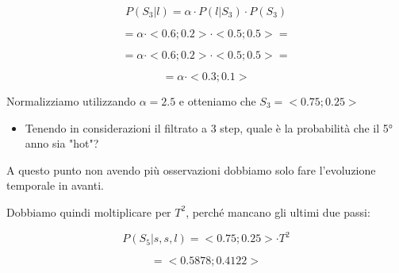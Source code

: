 \documentclass{article}
\begin{document}
\[
P(S_3 | l) = \alpha \cdot P(l | S_3) \cdot P(S_3)
\]

\[
 = \alpha \cdot <0.6; 0.2> \cdot <0.5; 0.5> =
\]

\[
= \alpha \cdot <0.6; 0.2> \cdot <0.5; 0.5> =
\]

\[
= \alpha \cdot <0.3; 0.1>
\]

Normalizziamo utilizzando $\alpha = 2.5$ e otteniamo che $S_3 = <0.75; 0.25>$

\pagebreak

\begin{itemize}
	\item Tenendo in considerazioni il filtrato a 3 step, quale è la probabilità che il 5° anno sia "hot"?
\end{itemize}

A questo punto non avendo più osservazioni dobbiamo solo fare l'evoluzione temporale in avanti.

Dobbiamo quindi moltiplicare per $T^2$, perché mancano gli ultimi due passi:

\[
P(S_5 | s, s, l) = <0.75; 0.25> \cdot T^2
\]

\[
 = < 0.5878; 0.4122> 
\]
\end{document}

